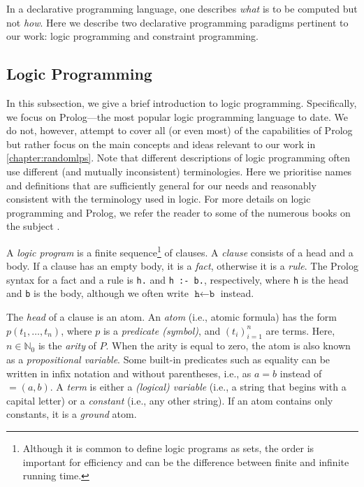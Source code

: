 In a declarative programming language, one describes \emph{what} is to be computed but not \emph{how}. Here we describe two declarative programming paradigms pertinent to our work: logic programming and constraint programming.

\subsection{Logic Programming} \label{sec:lp}

In this subsection, we give a brief introduction to logic programming. Specifically, we focus on Prolog---the most popular logic programming language to date. We do not, however, attempt to cover all (or even most) of the capabilities of Prolog but rather focus on the main concepts and ideas relevant to our work in \cref{chapter:randomlps}. Note that different descriptions of logic programming often use different (and mutually inconsistent) terminologies. Here we prioritise names and definitions that are sufficiently general for our needs and reasonably consistent with the terminology used in logic. For more details on logic programming and Prolog, we refer the reader to some of the numerous books on the subject \citep{DBLP:books/daglib/0041598,DBLP:books/daglib/0067951}.

A \emph{logic program} is a finite sequence\footnote{Although it is common to define logic programs as sets, the order is important for efficiency and can be the difference between finite and infinite running time.} of clauses. A \emph{clause} consists of a head and a body. If a clause has an empty body, it is a \emph{fact}, otherwise it is a \emph{rule}. The Prolog syntax for a fact and a rule is \verb+h.+ and \verb+h :- b.+, respectively, where \texttt{h} is the head and \texttt{b} is the body, although we often write $\texttt{h} \gets \texttt{b}$ instead.

The \emph{head} of a clause is an atom. An \emph{atom} (i.e., atomic formula) has the form $p(t_1, \dots, t_n)$, where $p$ is a \emph{predicate (symbol)}, and $(t_i)_{i=1}^n$ are terms. Here, $n \in \mathbb{N}_0$ is the \emph{arity} of $P$. When the arity is equal to zero, the atom is also known as a \emph{propositional variable}. Some built-in predicates such as equality can be written in infix notation and without parentheses, i.e., as $a = b$ instead of $=(a, b)$. A \emph{term} is either a \emph{(logical) variable} (i.e., a string that begins with a capital letter) or a \emph{constant} (i.e., any other string). If an atom contains only constants, it is a \emph{ground} atom.

